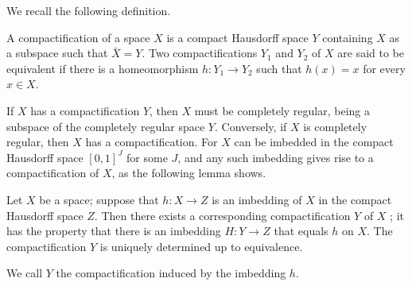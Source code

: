 We recall the following definition.

\begin{definition}
 A compactification of a space \(X\) is a compact Hausdorff space \(Y\) containing \(X\) as a subspace such that \(\bar{X} = Y\). Two compactifications \(Y_{1}\) and \(Y_{2}\) of \(X\) are said to be equivalent if there is a homeomorphism \(h : Y_{1} \rightarrow {Y}_{2}\) such that \(h(x) = x\) for every \(x \in X\).
\end{definition}

If \(X\) has a compactification \(Y\), then \(X\) must be completely regular, being a subspace of the completely regular space \(Y\). Conversely, if \(X\) is completely regular, then \(X\) has a compactification. For \(X\) can be imbedded in the compact Hausdorff space \({[ 0,1] }^{J}\) for some \(J\), and any such imbedding gives rise to a compactification of \(X\), as the following lemma shows.

\begin{lemma}
\label{lem:\thetheorem}
 Let \(X\) be a space; suppose that \(h : X \rightarrow Z\) is an imbedding of \(X\) in the compact Hausdorff space \(Z\). Then there exists a corresponding compactification \(Y\) of \(X\) ; it has the property that there is an imbedding \(H : Y \rightarrow Z\) that equals \(h\) on \(X\). The compactification \(Y\) is uniquely determined up to equivalence.
\end{lemma}

We call \(Y\) the compactification induced by the imbedding \(h\).

